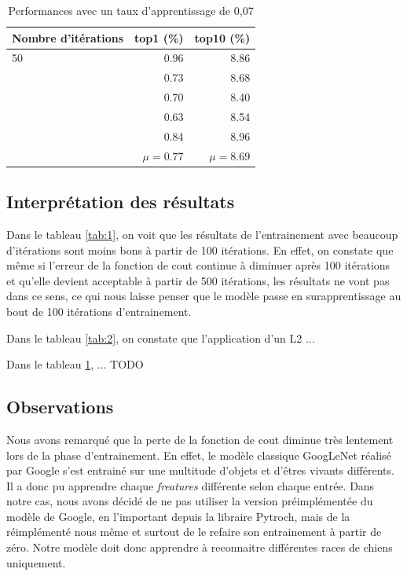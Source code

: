 \documentclass{article}
\begin{document}
\begin{table}[htbp]
\centering
\begin{tabular}{lrr}  
\toprule
Nombre d'itérations & top1 (\%) & top10 (\%) \\
\midrule
50 & 0.96 & 8.86 \\
     & 0.73 & 8.68 \\
     & 0.70 & 8.40 \\
     & 0.63 & 8.54 \\
     & 0.84 & 8.96 \\
     & $\mu = 0.77$ &  $\mu = 8.69$ \\
\bottomrule
\end{tabular}
\caption{Performances avec un taux d'apprentissage de 0,07}
\label{tab:3}
\end{table}

\subsection{Interprétation des résultats}
Dans le tableau \ref{tab:1}, on voit que les résultats de l’entrainement avec
beaucoup d’itérations sont moins bons à partir de 100 itérations. En effet, on
constate que même si l’erreur de la fonction de cout continue à diminuer après
100 itérations et qu’elle devient acceptable à partir de 500 itérations, les
résultats ne vont pas dans ce sens, ce qui nous laisse penser que le modèle
passe en surapprentissage au bout de 100 itérations d’entrainement.

Dans le tableau \ref{tab:2}, on constate que l'application d'un L2 ...

Dans le tableau \ref{tab:3}, ... TODO

\subsection{Observations}
Nous avons remarqué que la perte de la fonction de cout diminue très lentement
lors de la phase d’entrainement. En effet, le modèle classique GoogLeNet réalisé
par Google s’est entrainé sur une multitude d’objets et d'êtres vivants
différents. Il a donc pu apprendre chaque \textit{freatures} différente selon
chaque entrée. Dans notre cas, nous avons décidé de ne pas utiliser la version
préimplémentée du modèle de Google, en l'important depuis la libraire Pytroch,
mais de la réimplémenté nous même et surtout de le refaire son entrainement à
partir de zéro. Notre modèle doit donc apprendre à reconnaitre différentes races
de chiens uniquement.
\end{document}
